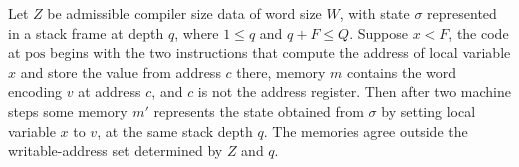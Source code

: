 \begin{theorem}
\label{Light.Compiler.steps_setVar}
\leanok
{}
Let $Z$ be admissible compiler size data of word size $W$, with state $\sigma$
represented in a stack frame at depth $q$, where $1\le q$ and $q+F\le Q$. Suppose $x<F$,
the code at $\mathrm{pos}$ begins with the two instructions that compute the address of
local variable $x$ and store the value from address $c$ there, memory $m$ contains the
word encoding $v$ at address $c$, and $c$ is not the address register. Then after two
machine steps some memory $m'$ represents the state obtained from $\sigma$ by setting
local variable $x$ to $v$, at the same stack depth $q$. The memories agree outside the
writable-address set determined by $Z$ and $q$.
\end{theorem}
